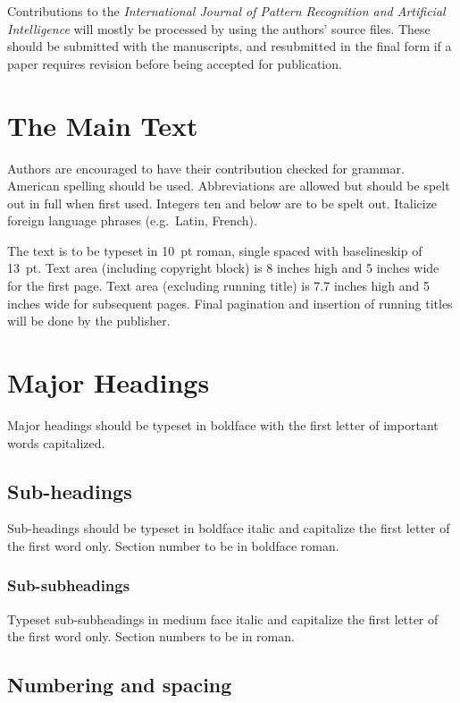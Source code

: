 \documentclass{ws-ijprai}
\begin{document}
Contributions to the {\it International Journal of Pattern Recognition
and Artificial Intelligence} will mostly be processed
by using the authors' source files. These should be submitted
with the manuscripts, and resubmitted in the final form if a paper
requires revision before being accepted for publication.

\section{The Main Text}

Authors are encouraged to have their contribution checked for grammar.
American spelling should be used. Abbreviations are allowed but should
be spelt out in full when first used. Integers ten and below are to be
spelt out. Italicize foreign language phrases (e.g.~Latin, French).

The text is to be typeset in 10~pt roman, single spaced with
baselineskip of 13~pt. Text area (including copyright block) is
8 inches high and 5 inches wide for the first page. Text area
(excluding running title) is 7.7 inches high and 5 inches wide for
subsequent pages. Final pagination and insertion of running titles
will be done by the publisher.

\section{Major Headings}

Major headings should be typeset in boldface with the first letter of
important words capitalized.

\subsection{Sub-headings}

Sub-headings should be typeset in boldface italic and capitalize
the first letter of the first word only. Section number to be in
boldface roman.

\subsubsection{Sub-subheadings}

Typeset sub-subheadings in medium face italic and capitalize the
first letter of the first word only. Section numbers to be in
roman.

\subsection{Numbering and spacing}
\end{document}
